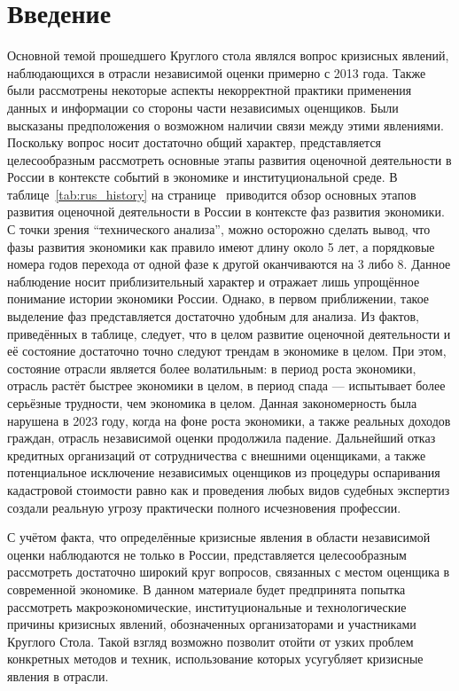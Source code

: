 \documentclass[12pt]{scrartcl}
\begin{document}
\section{Введение}\label{sec:Introduction}
Основной темой прошедшего Круглого стола являлся вопрос кризисных явлений, наблюдающихся в отрасли независимой оценки примерно с 2013 года. Также были рассмотрены некоторые аспекты некорректной практики применения данных и информации со стороны части независимых оценщиков. Были высказаны предположения о возможном наличии связи между этими явлениями. Поскольку вопрос носит достаточно общий характер, представляется целесообразным рассмотреть основные этапы развития оценочной деятельности в России в контексте событий в экономике и институциональной среде. В таблице~\ref{tab:rus_history} на странице~\pageref{tab:rus_history} приводится обзор основных этапов развития оценочной деятельности в России в контексте фаз развития экономики. С точки зрения ``технического анализа'', можно осторожно сделать вывод, что фазы развития экономики как правило имеют длину около 5 лет, а порядковые номера годов перехода от одной фазе к другой оканчиваются на 3 либо 8. Данное наблюдение носит приблизительный характер и отражает лишь упрощённое понимание истории экономики России. Однако, в первом приближении, такое выделение фаз представляется достаточно удобным для анализа. Из фактов, приведённых в таблице, следует, что в целом развитие оценочной деятельности и её состояние достаточно точно следуют трендам в экономике в целом. При этом, состояние отрасли является более волатильным: в период роста экономики, отрасль растёт быстрее экономики в целом, в период спада --- испытывает более серьёзные трудности, чем экономика в целом. Данная закономерность была нарушена в 2023 году, когда на фоне роста экономики, а также реальных доходов граждан, отрасль независимой оценки продолжила падение. Дальнейший отказ кредитных организаций от сотрудничества с внешними оценщиками, а также потенциальное исключение независимых оценщиков из процедуры оспаривания кадастровой стоимости равно как и проведения любых видов судебных экспертиз создали реальную угрозу практически полного исчезновения профессии.

С учётом факта, что определённые кризисные явления в области независимой оценки наблюдаются не только в России, представляется целесообразным рассмотреть достаточно широкий круг вопросов, связанных с местом оценщика в современной экономике. В данном материале будет предпринята попытка рассмотреть макроэкономические, институциональные и технологические причины кризисных явлений, обозначенных организаторами и участниками Круглого Стола. Такой взгляд возможно позволит отойти от узких проблем конкретных методов и техник, использование которых усугубляет кризисные явления в отрасли.
\end{document}
